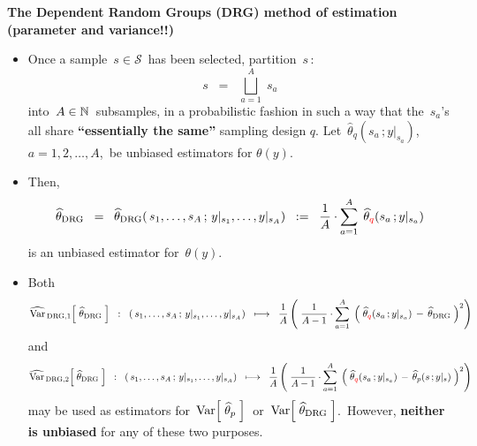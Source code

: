 \vskip 0.5cm
\noindent
\textbf{The Dependent Random Groups (DRG) method of estimation (parameter and variance!!)}
\begin{itemize}
\item
	Once a sample \,$s \in \mathcal{S}$\, has been selected, partition \,$s$\,:
	\begin{equation*}
	s \;\; = \;\; \overset{A}{\underset{a = 1}{\bigsqcup}}\;s_{a}
	\end{equation*}
	into \,$A \in \mathbb{N}$\, subsamples, in a probabilistic fashion in such a way that
	the \,$s_{a}$'s\, all share \textbf{\color{red}``essentially the same''} sampling design $q$.
	Let \,$\widehat{\theta}_{q}(s_{a}\,;y\vert_{s_{a}})$,\, $a = 1,2,\ldots,A$,\, be unbiased estimators
	for $\theta(y)$.
\item
	Then,
	\begin{equation*}
	\widehat{\theta}_{\textnormal{DRG}}
	\;\; = \;\;
		\widehat{\theta}_{\textnormal{DRG}}(\,s_{1},\ldots,s_{A}\,;\,y\vert_{s_{1}},\ldots,y\vert_{s_{A}})
	\;\; := \;\;
		\dfrac{1}{A}\cdot\overset{A}{\underset{a=1}{\sum}}\;\,\widehat{\theta}_{\color{red}q}(s_{a}\,;y\vert_{s_{a}})
	\end{equation*}
	is an unbiased estimator for \,$\theta(y)$.
\item
	Both
	\begin{equation*}
	\widehat{\textnormal{Var}}_{\,\textnormal{DRG},1}\!\left[\;\widehat{\theta}_{\textnormal{DRG}}\;\right]
	\;\; : \;\;
		(\,s_{1},\ldots,s_{A}\,;\,y\vert_{s_{1}},\ldots,y\vert_{s_{A}})
	\;\; \longmapsto \;\;
		\dfrac{1}{A}
		\left(\;
			\dfrac{1}{A-1}\cdot
			\overset{A}{\underset{a=1}{\sum}}\;
			\left(\;\widehat{\theta}_{\color{red}q}(s_{a}\,;y\vert_{s_{a}}) \,-\, \widehat{\theta}_{\textnormal{DRG}}\;\right)^{2}
			\right)
	\end{equation*}
	and
	\begin{equation*}
	\widehat{\textnormal{Var}}_{\,\textnormal{DRG},2}\!\left[\;\widehat{\theta}_{\textnormal{DRG}}\;\right]
	\;\; : \;\;
		(\,s_{1},\ldots,s_{A}\,;\,y\vert_{s_{1}},\ldots,y\vert_{s_{A}})
	\;\; \longmapsto \;\;
		\dfrac{1}{A}
		\left(\;
			\dfrac{1}{A-1}\cdot
			\overset{A}{\underset{a=1}{\sum}}\;
			\left(\;\widehat{\theta}_{\color{red}q}(s_{a}\,;y\vert_{s_{a}}) \,-\, \widehat{\theta}_{p}(s\,;y\vert_{s})\;\right)^{2}
			\right)
	\end{equation*}
	may be used as estimators for
	\,$\textnormal{Var}\!\left[\;\widehat{\theta}_{p}\;\right]$\,
	or
	\,$\textnormal{Var}\!\left[\;\widehat{\theta}_{\textnormal{DRG}}\;\right]$.\,
	However, \textbf{\color{red}neither is unbiased} for any of these two purposes.
\end{itemize}

